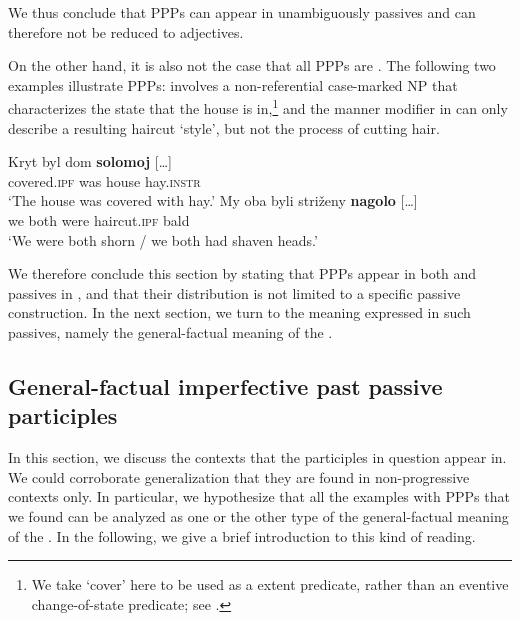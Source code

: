 \documentclass[output=paper,modfonts,newtxmath,hidelinks
\ChapterDOI{10.5281/zenodo.2545513}
]{langscibook}
\begin{document}
\noindent We thus conclude that  PPPs can appear in unambiguously  passives and can therefore not be reduced to adjectives. 

On the other hand, it is also not the case that all  PPPs are . The following two examples illustrate  PPPs:  involves a non-referential  case-marked NP that characterizes the state that the house is in,\footnote{We take `cover' here to be used as a  extent predicate, rather than an eventive change-of-state predicate; see \citet{gawron09}.} and the  manner modifier in  can only describe a resulting haircut `style', but not the process of cutting hair.

\ea\label{kryt}
\ea\gll 	Kryt byl dom \textbf{solomoj} [\dots]\\ 		
	covered.\textsc{ipf} was house hay.\textsc{instr} 	\\
\glt	`The house was covered with hay.'\label{kryta}
\ex\gll	My oba byli striženy \textbf{nagolo} [\dots]\\
	we both were haircut.\textsc{ipf} bald\\
\glt	`We were both shorn / we both had shaven heads.'\label{nagolo} 
\z\z

\noindent We therefore conclude this section by stating that  PPPs appear in both  and  passives in , and that their distribution is not limited to a specific passive construction. In the next section, we turn to the meaning expressed in such passives, namely the general-factual meaning of the .

\subsection{General-factual imperfective past passive participles} 
\label{whichIPF}

In this section, we discuss the  contexts that the participles in question appear in. We could corroborate  generalization that they are found in non-progressive  contexts only. In particular, we hypothesize that all the examples with  PPPs that we found can be analyzed as one or the other type of the general-factual meaning of the . In the following, we give a brief introduction to this kind of reading.
\end{document}
